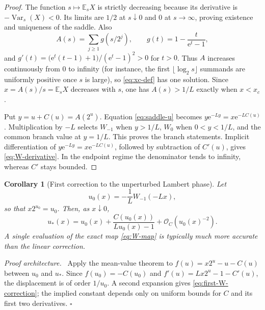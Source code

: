 \documentclass[11pt,oneside]{article}
\newtheorem{corollary}[theorem]{Corollary}
\theoremstyle{definition}
\theoremstyle{remark}
\newcommand{\E}{\mathbb E}
\newcommand{\Var}{\operatorname{Var}}
\newcommand{\e}{\mathrm e}
\newcommand{\bigO}{\mathcal O}
\newenvironment{proofidea}{\par\smallskip\noindent\textit{Proof architecture.}\ }{\hfill$\square$\par\smallskip}
\begin{document}
\begin{proof}
The function $s\mapsto\E_sX$ is strictly decreasing because its derivative is
$-\Var_s(X)<0$.  Its limits are $1/2$ at $s\downarrow0$ and $0$ at $s\to\infty$, proving
existence and uniqueness of the saddle.  Also
\[
 A(s)=\sum_{j\ge1}g(s/2^j),\qquad
 g(t)=1-\frac{t}{\e^t-1},
\]
and
$g'(t)=\bigl(\e^t(t-1)+1\bigr)/(\e^t-1)^2>0$ for $t>0$.
Thus $A$ increases continuously from $0$ to infinity (for instance, the first
$\lfloor\log_2s\rfloor$ summands are uniformly positive once $s$ is large), so
\eqref{eq:xc-def} has one solution.  Since $x=A(s)/s=\E_sX$ decreases with $s$, one has
$A(s)>1/L$ exactly when $x<x_c$.

Put $y=u+C(u)=A(2^u)$.  Equation \eqref{eq:saddle-u} becomes
$y\e^{-Ly}=x\e^{-LC(u)}$.  Multiplication by $-L$ selects $W_{-1}$ when
$y>1/L$, $W_0$ when $0<y<1/L$, and the common branch value at $y=1/L$.  This proves the
branch statements.  Implicit differentiation of
$y\e^{-Ly}=x\e^{-LC(u)}$, followed by subtraction of $C'(u)$, gives
\eqref{eq:W-derivative}.  In the endpoint regime the denominator tends to infinity,
whereas $C'$ stays bounded.
\end{proof}

\begin{corollary}[First correction to the unperturbed Lambert phase]
Let
\begin{equation}
 u_0(x)=-\frac1L W_{-1}(-Lx),                              \label{eq:u0}
\end{equation}
so that $x2^{u_0}=u_0$.  Then, as $x\downarrow0$,
\begin{equation}
 u_*(x)=u_0(x)+\frac{C(u_0(x))}{Lu_0(x)-1}
 +\bigO_C\!\left(u_0(x)^{-2}\right).                       \label{eq:first-W-correction}
\end{equation}
A single evaluation of the exact map \eqref{eq:W-map} is typically much more accurate than
the linear correction.
\end{corollary}

\begin{proofidea}
Apply the mean-value theorem to
$f(u)=x2^u-u-C(u)$ between $u_0$ and $u_*$.  Since
$f(u_0)=-C(u_0)$ and $f'(u)=Lx2^u-1-C'(u)$, the displacement is of order $1/u_0$.
A second expansion gives \eqref{eq:first-W-correction}; the implied constant depends only on uniform bounds for $C$ and its first two derivatives.
\end{proofidea}
\end{document}
